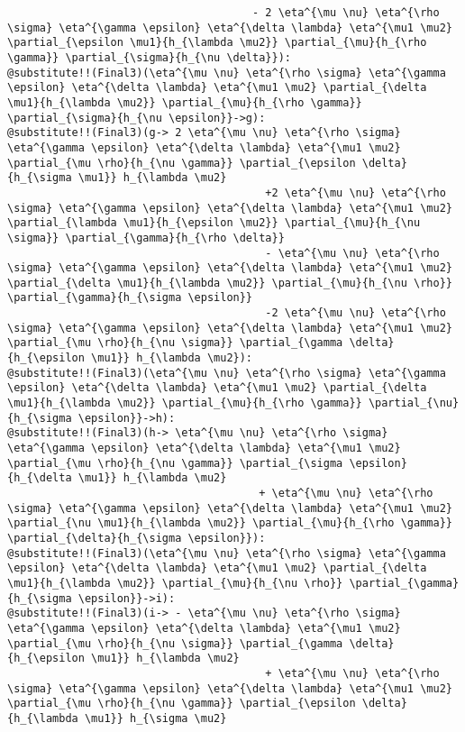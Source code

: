 \documentclass[11pt]{article}
\begin{document}
{\begin{verbatim}
                                      - 2 \eta^{\mu \nu} \eta^{\rho \sigma} \eta^{\gamma \epsilon} \eta^{\delta \lambda} \eta^{\mu1 \mu2} \partial_{\epsilon \mu1}{h_{\lambda \mu2}} \partial_{\mu}{h_{\rho \gamma}} \partial_{\sigma}{h_{\nu \delta}}):
@substitute!!(Final3)(\eta^{\mu \nu} \eta^{\rho \sigma} \eta^{\gamma \epsilon} \eta^{\delta \lambda} \eta^{\mu1 \mu2} \partial_{\delta \mu1}{h_{\lambda \mu2}} \partial_{\mu}{h_{\rho \gamma}} \partial_{\sigma}{h_{\nu \epsilon}}->g):
@substitute!!(Final3)(g-> 2 \eta^{\mu \nu} \eta^{\rho \sigma} \eta^{\gamma \epsilon} \eta^{\delta \lambda} \eta^{\mu1 \mu2} \partial_{\mu \rho}{h_{\nu \gamma}} \partial_{\epsilon \delta}{h_{\sigma \mu1}} h_{\lambda \mu2}
                                        +2 \eta^{\mu \nu} \eta^{\rho \sigma} \eta^{\gamma \epsilon} \eta^{\delta \lambda} \eta^{\mu1 \mu2} \partial_{\lambda \mu1}{h_{\epsilon \mu2}} \partial_{\mu}{h_{\nu \sigma}} \partial_{\gamma}{h_{\rho \delta}}
                                        - \eta^{\mu \nu} \eta^{\rho \sigma} \eta^{\gamma \epsilon} \eta^{\delta \lambda} \eta^{\mu1 \mu2} \partial_{\delta \mu1}{h_{\lambda \mu2}} \partial_{\mu}{h_{\nu \rho}} \partial_{\gamma}{h_{\sigma \epsilon}}
                                        -2 \eta^{\mu \nu} \eta^{\rho \sigma} \eta^{\gamma \epsilon} \eta^{\delta \lambda} \eta^{\mu1 \mu2} \partial_{\mu \rho}{h_{\nu \sigma}} \partial_{\gamma \delta}{h_{\epsilon \mu1}} h_{\lambda \mu2}): 
@substitute!!(Final3)(\eta^{\mu \nu} \eta^{\rho \sigma} \eta^{\gamma \epsilon} \eta^{\delta \lambda} \eta^{\mu1 \mu2} \partial_{\delta \mu1}{h_{\lambda \mu2}} \partial_{\mu}{h_{\rho \gamma}} \partial_{\nu}{h_{\sigma \epsilon}}->h):
@substitute!!(Final3)(h-> \eta^{\mu \nu} \eta^{\rho \sigma} \eta^{\gamma \epsilon} \eta^{\delta \lambda} \eta^{\mu1 \mu2} \partial_{\mu \rho}{h_{\nu \gamma}} \partial_{\sigma \epsilon}{h_{\delta \mu1}} h_{\lambda \mu2}
                                       + \eta^{\mu \nu} \eta^{\rho \sigma} \eta^{\gamma \epsilon} \eta^{\delta \lambda} \eta^{\mu1 \mu2} \partial_{\nu \mu1}{h_{\lambda \mu2}} \partial_{\mu}{h_{\rho \gamma}} \partial_{\delta}{h_{\sigma \epsilon}}):
@substitute!!(Final3)(\eta^{\mu \nu} \eta^{\rho \sigma} \eta^{\gamma \epsilon} \eta^{\delta \lambda} \eta^{\mu1 \mu2} \partial_{\delta \mu1}{h_{\lambda \mu2}} \partial_{\mu}{h_{\nu \rho}} \partial_{\gamma}{h_{\sigma \epsilon}}->i):
@substitute!!(Final3)(i-> - \eta^{\mu \nu} \eta^{\rho \sigma} \eta^{\gamma \epsilon} \eta^{\delta \lambda} \eta^{\mu1 \mu2} \partial_{\mu \rho}{h_{\nu \sigma}} \partial_{\gamma \delta}{h_{\epsilon \mu1}} h_{\lambda \mu2}
                                        + \eta^{\mu \nu} \eta^{\rho \sigma} \eta^{\gamma \epsilon} \eta^{\delta \lambda} \eta^{\mu1 \mu2} \partial_{\mu \rho}{h_{\nu \gamma}} \partial_{\epsilon \delta}{h_{\lambda \mu1}} h_{\sigma \mu2}

\end{verbatim}}
\end{document}
